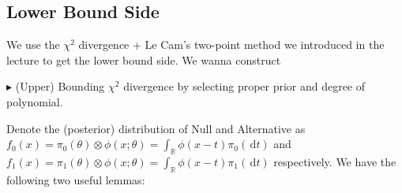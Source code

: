 \documentclass[11pt,a4paper]{article}
\numberwithin{equation}{section}%
\newenvironment{point}{\raggedright$\blacktriangleright$}{}
\begin{document}
\subsection{Lower Bound Side}

We use the $ \chi^2 $ divergence + Le Cam's two-point method we introduced in the lecture to get the lower bound side. We wanna construct 




\begin{point}
    (Upper) Bounding $ \chi^2 $ divergence by selecting proper prior and degree of polynomial.
\end{point}

Denote the (posterior) distribution of Null and Alternative as $ f_0(x)=\pi_0(\theta ) \otimes \phi(x;\theta ) = \int_\mathbb{R} \phi (x-t) \pi_0(\,\mathrm{d}t) $ and $ f_1(x)=\pi_1(\theta ) \otimes \phi(x;\theta ) = \int_\mathbb{R} \phi (x-t) \pi_1(\,\mathrm{d}t) $ respectively. We have the following two useful lemmas:
\end{document}
